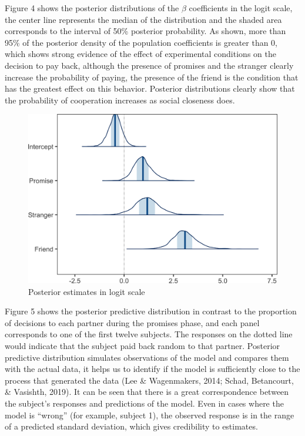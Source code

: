 \documentclass[12pt,]{article}
\begin{document}
Figure 4 shows the posterior distributions of the \(\beta\) coefficients
in the logit scale, the center line represents the median of the
distribution and the shaded area corresponds to the interval of 50\%
posterior probability. As shown, more than 95\% of the posterior density
of the population coefficients is greater than 0, which shows strong
evidence of the effect of experimental conditions on the decision to pay
back, although the presence of promises and the stranger clearly
increase the probability of paying, the presence of the friend is the
condition that has the greatest effect on this behavior. Posterior
distributions clearly show that the probability of cooperation increases
as social closeness does.

\begin{figure}

{\centering \includegraphics[width=0.8\linewidth]{article_english_files/figure-latex/fig4-1} 

}

\caption{Posterior estimates in logit scale}\label{fig:fig4}
\end{figure}

Figure 5 shows the posterior predictive distribution in contrast to the
proportion of decisions to each partner during the promises phase, and
each panel corresponds to one of the first twelve subjects. The
responses on the dotted line would indicate that the subject paid back
random to that partner. Posterior predictive distribution simulates
observations of the model and compares them with the actual data, it
helps us to identify if the model is sufficiently close to the process
that generated the data (Lee \& Wagenmakers, 2014; Schad, Betancourt, \&
Vasishth, 2019). It can be seen that there is a great correspondence
between the subject's responses and predictions of the model. Even in
cases where the model is ``wrong'' (for example, subject 1), the
observed response is in the range of a predicted standard deviation,
which gives credibility to estimates.
\end{document}
